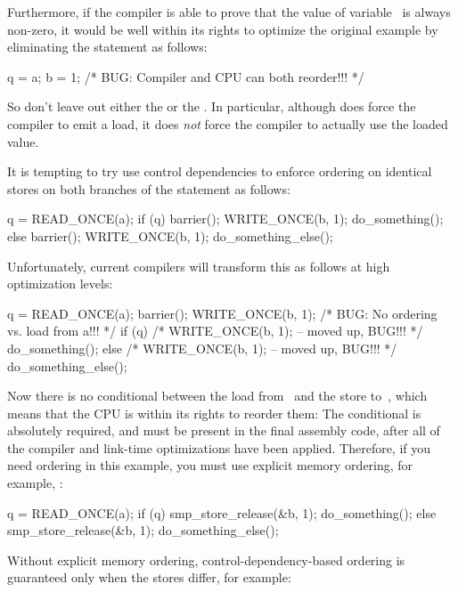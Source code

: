 Furthermore, if the compiler is able to prove that the value of
variable~ is always non-zero, it would be well within its rights
to optimize the original example by eliminating the  statement
as follows:

\begin{VerbatimU}
	q = a;
	b = 1;  /* BUG: Compiler and CPU can both reorder!!! */
\end{VerbatimU}

So don't leave out either the  or the .
In particular, although  does force the compiler to emit a
load, it does \emph{not} force the compiler to actually use the loaded value.

It is tempting to try use control dependencies to enforce ordering on
identical stores on both branches of the  statement as follows:

\begin{VerbatimU}
	q = READ_ONCE(a);
	if (q) {
		barrier();
		WRITE_ONCE(b, 1);
		do_something();
	} else {
		barrier();
		WRITE_ONCE(b, 1);
		do_something_else();
	}
\end{VerbatimU}

Unfortunately, current compilers will transform this as follows at high
optimization levels:

\begin{VerbatimU}
	q = READ_ONCE(a);
	barrier();
	WRITE_ONCE(b, 1);  /* BUG: No ordering vs. load from a!!! */
	if (q) {
		/* WRITE_ONCE(b, 1); -- moved up, BUG!!! */
		do_something();
	} else {
		/* WRITE_ONCE(b, 1); -- moved up, BUG!!! */
		do_something_else();
	}
\end{VerbatimU}

Now there is no conditional between the load from~ and the store
to~, which means that the CPU is within its rights to reorder them:
The conditional is absolutely required, and must be present in the final
assembly code, after all of the compiler and link-time optimizations
have been applied.
Therefore, if you need ordering in this example, you must use explicit
memory ordering, for example, :

\begin{VerbatimU}
	q = READ_ONCE(a);
	if (q) {
		smp_store_release(&b, 1);
		do_something();
	} else {
		smp_store_release(&b, 1);
		do_something_else();
	}
\end{VerbatimU}

Without explicit memory ordering, control-dependency-based ordering is
guaranteed only when the stores differ, for example:

